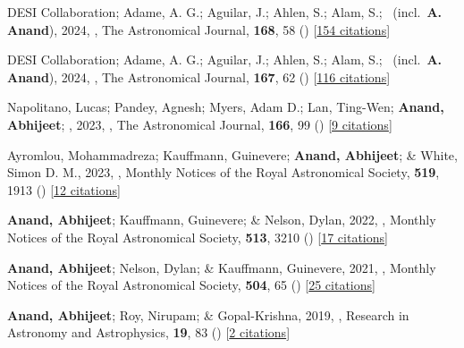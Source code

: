 \item[{\color{numcolor}\scriptsize7}] DESI Collaboration; Adame, A. G.; Aguilar, J.; Ahlen, S.; Alam, S.; \etal\ (incl.\ \textbf{A. Anand}), 2024, , The Astronomical Journal, \textbf{168}, 58 () [\href{https://ui.adsabs.harvard.edu/abs/2024AJ....168...58D}{154 citations}]

\item[{\color{numcolor}\scriptsize6}] DESI Collaboration; Adame, A. G.; Aguilar, J.; Ahlen, S.; Alam, S.; \etal\ (incl.\ \textbf{A. Anand}), 2024, , The Astronomical Journal, \textbf{167}, 62 () [\href{https://ui.adsabs.harvard.edu/abs/2024AJ....167...62D}{116 citations}]

\item[{\color{numcolor}\scriptsize5}] Napolitano, Lucas; Pandey, Agnesh; Myers, Adam D.; Lan, Ting-Wen; \textbf{Anand, Abhijeet}; \etal, 2023, , The Astronomical Journal, \textbf{166}, 99 () [\href{https://ui.adsabs.harvard.edu/abs/2023AJ....166...99N}{9 citations}]

\item[{\color{numcolor}\scriptsize4}] Ayromlou, Mohammadreza; Kauffmann, Guinevere; \textbf{Anand, Abhijeet}; \& White, Simon D. M., 2023, , Monthly Notices of the Royal Astronomical Society, \textbf{519}, 1913 () [\href{https://ui.adsabs.harvard.edu/abs/2023MNRAS.519.1913A}{12 citations}]

\item[{\color{numcolor}\scriptsize3}] \textbf{Anand, Abhijeet}; Kauffmann, Guinevere; \& Nelson, Dylan, 2022, , Monthly Notices of the Royal Astronomical Society, \textbf{513}, 3210 () [\href{https://ui.adsabs.harvard.edu/abs/2022MNRAS.513.3210A}{17 citations}]

\item[{\color{numcolor}\scriptsize2}] \textbf{Anand, Abhijeet}; Nelson, Dylan; \& Kauffmann, Guinevere, 2021, , Monthly Notices of the Royal Astronomical Society, \textbf{504}, 65 () [\href{https://ui.adsabs.harvard.edu/abs/2021MNRAS.504...65A}{25 citations}]

\item[{\color{numcolor}\scriptsize1}] \textbf{Anand, Abhijeet}; Roy, Nirupam; \& Gopal-Krishna, 2019, , Research in Astronomy and Astrophysics, \textbf{19}, 83 () [\href{https://ui.adsabs.harvard.edu/abs/2019RAA....19...83A}{2 citations}]